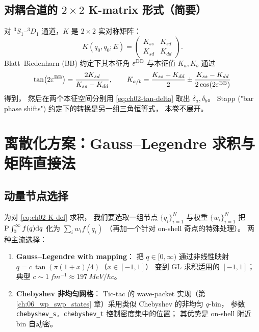 \subsection{对耦合道的 $2\times 2$ K-matrix 形式（简要）}

对 $^3S_1$--$^3D_1$ 通道，$K$ 是 $2\times 2$ 实对称矩阵：
\begin{equation}
  K(q_0, q_0; E) =
  \begin{pmatrix} K_{ss} & K_{sd}\\ K_{sd} & K_{dd} \end{pmatrix}.
  \label{eq:ch02-K-2x2}
\end{equation}
Blatt--Biedenharn (BB) 约定下其本征角 $\varepsilon^{\text{BB}}$ 与本征值 $K_a, K_b$
通过
\begin{equation}
  \tan(2 \varepsilon^{\text{BB}}) = \frac{2 K_{sd}}{K_{ss} - K_{dd}},
  \qquad
  K_{a/b} = \frac{K_{ss} + K_{dd}}{2} \pm \frac{K_{ss} - K_{dd}}{2 \cos(2\varepsilon^{\text{BB}})}
  \label{eq:ch02-BB-rotation}
\end{equation}
得到，
然后在两个本征空间分别用 \cref{eq:ch02-tan-delta} 取出
$\delta_a, \delta_b$。
Stapp ("bar phase shifts") 约定下的转换是另一组三角恒等式，
本卷不展开。

\section{离散化方案：Gauss--Legendre 求积与矩阵直接法}
\label{sec:ch02-discrete}

\subsection{动量节点选择}

为对 \cref{eq:ch02-K-def} 求积，
我们要选取一组节点 $\{q_i\}_{i=1}^{N}$ 与权重 $\{w_i\}_{i=1}^{N}$ 把
$\mathrm{P} \int_0^\infty f(q) \dd q$ 化为 $\sum_i w_i f(q_i)$
（再加一个针对 on-shell 奇点的特殊处理）。
两种主流选择：

\begin{enumerate}
  \item \textbf{Gauss--Legendre with mapping}：
        把 $q \in [0, \infty)$ 通过非线性映射 $q = c\, \tan(\pi (1+x)/4)$（$x \in [-1, 1]$）
        变到 GL 求积适用的 $[-1, 1]$；
        典型 $c \sim \SI{1}{fm^{-1}} \approx \SI{197}{MeV}/\hbar c$。
  \item \textbf{Chebyshev 非均匀网格}：
        Tic-tac 的 wave-packet 实现（第 \ref{ch:06_wp_swp_states} 章）采用类似 Chebyshev 的非均匀 $q$-bin，
        参数 \texttt{chebyshev\_s, chebyshev\_t} 控制密度集中的位置；
        其优势是 on-shell 附近 bin 自动密。
\end{enumerate}


